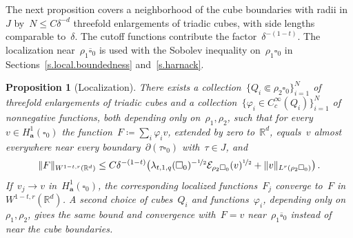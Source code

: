 \documentclass[11pt,letterpaper]{article}
\numberwithin{equation}{section}
\newtheorem{proposition}[theorem]{Proposition}
\theoremstyle{definition}
\newcommand{\Rd}{\mathbb{R}^d}
\renewcommand{\a}{\mathbf{a}}
\newcommand{\nf}{\nicefrac}
\newcommand{\cu}{\square}
\DeclarePairedDelimiter{\norm}{\lVert}{\rVert}
\newcommand{\Ener}{\mathcal E}
\begin{document}
The next proposition covers a neighborhood of the cube boundaries with radii in~$J$ by~$N\leq C\delta^{-d}$ threefold enlargements of triadic cubes, with side lengths comparable to~$\delta$. The cutoff functions contribute the factor~$\delta^{-(1-t)}$. The localization near~$\rho_1\overline{\cu}_0$ is used with the Sobolev inequality on~$\rho_1\cu_0$ in Sections~\ref{s.local.boundedness} and~\ref{s.harnack}.

\begin{proposition}[Localization]
\label{p.fractional.localization}
There exists a collection~$\{Q_i\Subset\rho_2\cu_0\}_{i=1}^N$ of threefold enlargements of triadic cubes and a collection~$\{\varphi_i\in C^\infty_c(Q_i)\}_{i=1}^N$ of nonnegative functions, both depending only on~$\rho_1,\rho_2$, such that for every~$v\in H^1_\a(\cu_0)$ the function~$F\coloneqq\sum_i\varphi_iv$, extended by zero to~$\Rd$, equals~$v$ almost everywhere near every boundary~$\partial(\tau\cu_0)$ with~$\tau\in J$, and
\begin{equation}
	\norm{F}_{W^{1-t,r}(\Rd)}\leq C\delta^{-(1-t)}\bigl(\lambda_{t,1,q}(\cu_0)^{-\nf12}\Ener_{\rho_2\cu_0}(v)^{\nf12}+\norm{v}_{L^r(\rho_2\cu_0)}\bigr)\,.
	\label{e.localized.fractional.bound}
\end{equation}
If~$v_j\to v$ in~$H^1_\a(\cu_0)$, the corresponding localized functions~$F_j$ converge to~$F$ in~$W^{1-t,r}(\Rd)$. A second choice of cubes~$Q_i$ and functions~$\varphi_i$, depending only on~$\rho_1,\rho_2$, gives the same bound and convergence with~$F=v$ near~$\rho_1\overline{\cu}_0$ instead of near the cube boundaries.
\end{proposition}
\end{document}
